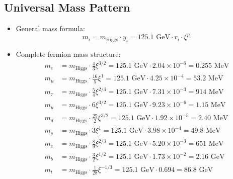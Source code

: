 \documentclass[12pt,a4paper]{article}
\begin{document}
\subsection{Universal Mass Pattern}
\begin{itemize}
	\item General mass formula:
	\begin{equation}
		m_i = m_{\text{Higgs}} \cdot y_i = 125.1 \text{ GeV} \cdot r_i \cdot \xi^{p_i}
	\end{equation}
	
	\item Complete fermion mass structure:
	\begin{align}
		m_e &= m_{\text{Higgs}} \cdot \frac{4}{3}\xi^{3/2} = 125.1 \text{ GeV} \cdot 2.04 \times 10^{-6} = 0.255 \text{ MeV}\\
		m_\mu &= m_{\text{Higgs}} \cdot \frac{16}{5}\xi^1 = 125.1 \text{ GeV} \cdot 4.25 \times 10^{-4} = 53.2 \text{ MeV}\\
		m_\tau &= m_{\text{Higgs}} \cdot \frac{5}{4}\xi^{2/3} = 125.1 \text{ GeV} \cdot 7.31 \times 10^{-3} = 914 \text{ MeV}\\
		m_u &= m_{\text{Higgs}} \cdot 6\xi^{3/2} = 125.1 \text{ GeV} \cdot 9.23 \times 10^{-6} = 1.15 \text{ MeV}\\
		m_d &= m_{\text{Higgs}} \cdot \frac{25}{2}\xi^{3/2} = 125.1 \text{ GeV} \cdot 1.92 \times 10^{-5} = 2.40 \text{ MeV}\\
		m_s &= m_{\text{Higgs}} \cdot 3\xi^1 = 125.1 \text{ GeV} \cdot 3.98 \times 10^{-4} = 49.8 \text{ MeV}\\
		m_c &= m_{\text{Higgs}} \cdot \frac{8}{9}\xi^{2/3} = 125.1 \text{ GeV} \cdot 5.20 \times 10^{-3} = 651 \text{ MeV}\\
		m_b &= m_{\text{Higgs}} \cdot \frac{3}{2}\xi^{1/2} = 125.1 \text{ GeV} \cdot 1.73 \times 10^{-2} = 2.16 \text{ GeV}\\
		m_t &= m_{\text{Higgs}} \cdot \frac{1}{28}\xi^{-1/3} = 125.1 \text{ GeV} \cdot 0.694 = 86.8 \text{ GeV}
	\end{align}
\end{itemize}
\end{document}
